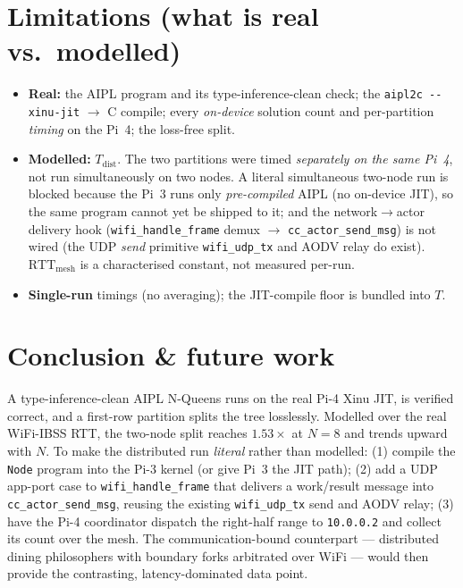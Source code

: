 \documentclass[11pt]{article}
\begin{document}
\section{Limitations (what is real vs.\ modelled)}
\begin{itemize}
  \item \textbf{Real:} the AIPL program and its type-inference-clean check; the
  \texttt{aipl2c -{}-xinu-jit} $\to$ C compile; every \emph{on-device} solution
  count and per-partition \emph{timing} on the Pi~4; the loss-free split.
  \item \textbf{Modelled:} $T_\mathrm{dist}$. The two partitions were timed
  \emph{separately on the same Pi~4}, not run simultaneously on two nodes. A
  literal simultaneous two-node run is blocked because the Pi~3 runs only
  \emph{pre-compiled} AIPL (no on-device JIT), so the same program cannot yet be
  shipped to it; and the network$\to$actor delivery hook
  (\texttt{wifi\_handle\_frame} demux $\to$ \texttt{cc\_actor\_send\_msg}) is not
  wired (the UDP \emph{send} primitive \texttt{wifi\_udp\_tx} and AODV relay do
  exist). $\mathrm{RTT_{mesh}}$ is a characterised constant, not measured per-run.
  \item \textbf{Single-run} timings (no averaging); the JIT-compile floor is
  bundled into $T$.
\end{itemize}

\section{Conclusion \& future work}
A type-inference-clean AIPL N-Queens runs on the real Pi-4 Xinu JIT, is verified
correct, and a first-row partition splits the tree losslessly. Modelled over the
real WiFi-IBSS RTT, the two-node split reaches $1.53\times$ at $N{=}8$ and trends
upward with $N$. To make the distributed run \emph{literal} rather than modelled:
(1) compile the \texttt{Node} program into the Pi-3 kernel (or give Pi~3 the JIT
path); (2) add a UDP app-port case to \texttt{wifi\_handle\_frame} that delivers a
work/result message into \texttt{cc\_actor\_send\_msg}, reusing the existing
\texttt{wifi\_udp\_tx} send and AODV relay; (3) have the Pi-4 coordinator dispatch
the right-half range to \texttt{10.0.0.2} and collect its count over the mesh.
The communication-bound counterpart --- distributed dining philosophers with
boundary forks arbitrated over WiFi --- would then provide the contrasting,
latency-dominated data point.
\end{document}
